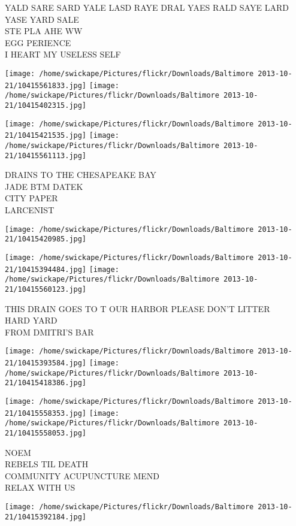 \documentclass[10pt,letterpaper]{article}
\begin{document}
YALD SARE SARD YALE LASD RAYE DRAL YAES RALD SAYE LARD YASE YARD SALE\\
STE PLA AHE WW\\
EGG PERIENCE\\
I HEART MY USELESS SELF
\pagebreak

\texttt{[image: /home/swickape/Pictures/flickr/Downloads/Baltimore 2013-10-21/10415561833.jpg]}
\texttt{[image: /home/swickape/Pictures/flickr/Downloads/Baltimore 2013-10-21/10415402315.jpg]}

\texttt{[image: /home/swickape/Pictures/flickr/Downloads/Baltimore 2013-10-21/10415421535.jpg]}
\texttt{[image: /home/swickape/Pictures/flickr/Downloads/Baltimore 2013-10-21/10415561113.jpg]}

DRAINS TO THE CHESAPEAKE BAY\\
JADE BTM DATEK\\
CITY PAPER\\
LARCENIST
\pagebreak

\texttt{[image: /home/swickape/Pictures/flickr/Downloads/Baltimore 2013-10-21/10415420985.jpg]}

\vspace{0.25in}
\texttt{[image: /home/swickape/Pictures/flickr/Downloads/Baltimore 2013-10-21/10415394484.jpg]}
\texttt{[image: /home/swickape/Pictures/flickr/Downloads/Baltimore 2013-10-21/10415560123.jpg]}

THIS DRAIN GOES TO T OUR HARBOR PLEASE DON'T LITTER\\
HARD YARD\\
FROM DMITRI'S BAR
\pagebreak

\texttt{[image: /home/swickape/Pictures/flickr/Downloads/Baltimore 2013-10-21/10415393584.jpg]}
\texttt{[image: /home/swickape/Pictures/flickr/Downloads/Baltimore 2013-10-21/10415418386.jpg]}

\texttt{[image: /home/swickape/Pictures/flickr/Downloads/Baltimore 2013-10-21/10415558353.jpg]}
\texttt{[image: /home/swickape/Pictures/flickr/Downloads/Baltimore 2013-10-21/10415558053.jpg]}

NOEM\\
REBELS TIL DEATH\\
COMMUNITY ACUPUNCTURE MEND\\
RELAX WITH US
\pagebreak

\texttt{[image: /home/swickape/Pictures/flickr/Downloads/Baltimore 2013-10-21/10415392184.jpg]}
\end{document}
